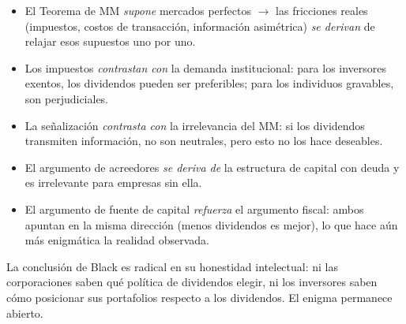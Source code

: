 \documentclass[12pt]{article}
\begin{document}
\begin{itemize}
  \item El Teorema de MM \textit{supone} mercados perfectos $\rightarrow$ las fricciones reales (impuestos, costos de transacci\'on, informaci\'on asim\'etrica) \textit{se derivan} de relajar esos supuestos uno por uno.
  \item Los impuestos \textit{contrastan con} la demanda institucional: para los inversores exentos, los dividendos pueden ser preferibles; para los individuos gravables, son perjudiciales.
  \item La se\~nalizaci\'on \textit{contrasta con} la irrelevancia del MM: si los dividendos transmiten informaci\'on, no son neutrales, pero esto no los hace deseables.
  \item El argumento de acreedores \textit{se deriva de} la estructura de capital con deuda y es irrelevante para empresas sin ella.
  \item El argumento de fuente de capital \textit{refuerza} el argumento fiscal: ambos apuntan en la misma direcci\'on (menos dividendos es mejor), lo que hace a\'un m\'as enigm\'atica la realidad observada.
\end{itemize}

\bigskip
La conclusi\'on de Black es radical en su honestidad intelectual: ni las corporaciones saben qu\'e pol\'itica de dividendos elegir, ni los inversores saben c\'omo posicionar sus portafolios respecto a los dividendos. El enigma permanece abierto.
\end{document}

